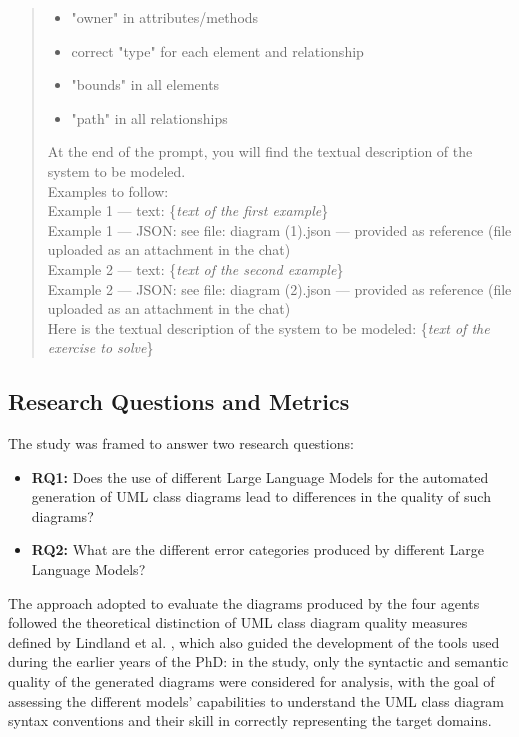 \begin{quote}
    \begin{itemize}
        \item "owner" in attributes/methods
        \item correct "type" for each element and relationship
        \item "bounds" in all elements
        \item "path" in all relationships
    \end{itemize}
    At the end of the prompt, you will find the textual description of the system to be modeled.\\
    Examples to follow:\\
    Example 1 — text: \{\textit{text of the first example}\}\\
    Example 1 — JSON: see file: diagram (1).json — provided as reference (file uploaded as an attachment in the chat)\\ 
    Example 2 — text: \{\textit{text of the second example}\}\\
    Example 2 — JSON: see file: diagram (2).json — provided as reference (file uploaded as an attachment in the chat)\\
    Here is the textual description of the system to be modeled: \{\textit{text of the exercise to solve}\}
\end{quote}

\subsection{Research Questions and Metrics}

The study was framed to answer two research questions:
\begin{itemize}
    \item \textbf{RQ1:} Does the use of different Large Language Models for the automated generation of UML class diagrams lead to differences in the quality of such diagrams?
    \item \textbf{RQ2:} What are the different error categories produced by different Large Language Models?
\end{itemize}

The approach adopted to evaluate the diagrams produced by the four agents followed the theoretical distinction of UML class diagram quality measures defined by Lindland et al. \cite{lindland1994understanding}, which also guided the development of the tools used during the earlier years of the PhD: in the study, only the syntactic and semantic quality of the generated diagrams were considered for analysis, with the goal of assessing the different models' capabilities to understand the UML class diagram syntax conventions and their skill in correctly representing the target domains.

